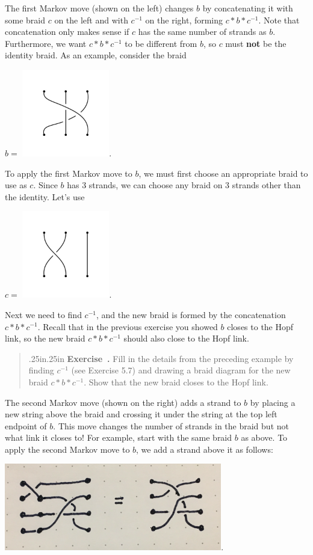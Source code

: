 \documentclass[12 pt]{article}
\newcounter{exercise}[section]
\newenvironment{exercise}{\refstepcounter{exercise}\par\bigskip \begin{quotation}{}{\leftmargin .25in\rightmargin .25in}
	\noindent \textbf{Exercise~\thesection.\theexercise }  \rmfamily}{\end{quotation}\par\bigskip}
\begin{document}
The first Markov move (shown  on the left) changes $b$ by concatenating it with some braid $c$ on the left and with $c^{-1}$ on the right, forming $c * b * c^{-1}$. Note that concatenation only makes sense if $c$ has the same number of strands as $b$. Furthermore, we want $c * b * c^{-1}$ to be different from $b$, so $c$ must \textbf{not} be the identity braid. As an example, consider the braid 
	\begin{center} 
		$b = $ \includegraphics*[height = 1.5in]{exercise_8_4}. 
	\end{center} 
To apply the first Markov move to $b$, we must first choose an appropriate braid to use as $c$. Since $b$ has 3 strands, we can choose any braid on 3 strands other than the identity.  Let's use 
	\begin{center} 
		$c =$ \includegraphics*[height = 1.5in]{exercise_4_c1}.
	\end{center} 
Next we need to find $c^{-1}$, and the new braid is formed by the concatenation $c * b * c^{-1}$. Recall that in the previous exercise you showed $b$ closes to the Hopf link, so the new braid $c * b * c^{-1}$ should also close to the Hopf link.

\begin{exercise}
	Fill in the details from the preceding example by finding $c^{-1}$ (see Exercise 5.7) and drawing a braid diagram for the new braid $c * b * c^{-1}$. Show that the new braid closes to the Hopf link.
\end{exercise}

The second Markov move (shown on the right) adds a strand to $b$ by placing a new string above the braid and crossing it under the string at the top left endpoint of $b$. This move changes the number of strands in the braid but not what link it closes to! For example, start with the same braid $b$ as above.  To apply the second Markov move to $b$, we add a strand above it as follows:
	\begin{center}
		\includegraphics*[height = 1.5in]{Markov_2_eg}.
	\end{center}
\end{document}

